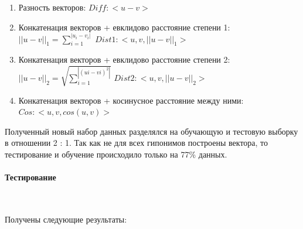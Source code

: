 \begin{enumerate}
\item Разность векторов: \newline
$Diff: <u - v>$

\item Конкатенация векторов + евклидово расстояние степени 1: \newline
$||u - v||_1 = \sum_{i=1}^{|u_i - v_i|}$ \newline
$Dist1: <u, v, ||u - v||_1>$

\item Конкатенация векторов + евклидово расстояние степени 2: \newline
$||u - v||_2 = \sqrt{\sum_{i=1}^{|(ui - vi)^2|}}$ \newline
$Dist2: <u, v, || u - v ||_2>$

\item Конкатенация векторов + косинусное расстояние между ними: \newline
$Cos: <u, v, cos(u, v)>$
\end{enumerate}

Полученный новый набор данных разделялся на обучающую и тестовую выборку в
отношении 2 : 1. Так как не для всех гипонимов построены вектора, то тестирование и
обучение происходило только на 77\% данных.

\paragraph{Тестирование}
~\
~\

Получены следующие результаты:


